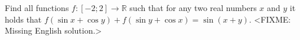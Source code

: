 \problem{}
Find all functions $f \colon [-2; 2] \to \mathbb{R}$ such that for any two real numbers
$x$ and $y$ it holds that
$f(\sin x + \cos y) + f(\sin y + \cos x) = \sin(x + y)$.
\solution
<FIXME: Missing English solution.>
\endproblem
